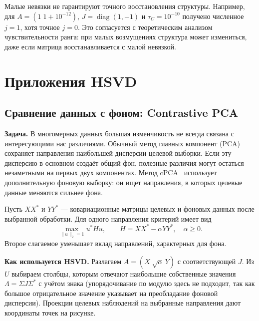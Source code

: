 \documentclass[a4paper,12pt]{article}
\DeclareMathOperator{\diag}{diag}
\theoremstyle{csstyle}
\begin{document}
Малые невязки не гарантируют точного восстановления структуры.
Например, для $A=(1\;1+10^{-12})$, $J=\diag(1,-1)$ и
$\tau_C=10^{-10}$ получено численное $j=1$, хотя точное $j=0$.
Это согласуется с теоретическим анализом чувствительности ранга:
при малых возмущениях структура может измениться, даже если матрица
восстанавливается с малой невязкой.



\section{Приложения HSVD}
\label{sec:applications}

\subsection{Сравнение данных с фоном: Contrastive PCA}
\textbf{Задача.}
В многомерных данных большая изменчивость не всегда связана
с интересующими нас различиями. Обычный метод главных компонент (PCA)
сохраняет направления наибольшей дисперсии целевой выборки.
Если эту дисперсию в основном создаёт общий фон, полезные различия
могут остаться незаметными на первых двух компонентах.
Метод cPCA~\cite{cPCA} использует дополнительную фоновую выборку:
он ищет направления, в которых целевые данные меняются сильнее фона.

Пусть $XX^*$ и $YY^*$ --- ковариационные матрицы целевых и фоновых
данных после выбранной обработки. Для одного направления критерий имеет вид
\[
\max_{\|u\|_2=1}u^*Hu,\qquad H=XX^*-\alpha YY^*,\quad\alpha\ge0.
\]
Второе слагаемое уменьшает вклад направлений, характерных для фона.

\textbf{Как используется HSVD.}
Разлагаем $A=(X\;\sqrt\alpha\,Y)$ с соответствующей $J$.
Из $U$ выбираем столбцы, которым отвечают наибольшие
собственные значения $\Lambda=\Sigma J\Sigma^*$ с учётом знака (упорядочивание по модулю здесь не подходит, так как большое отрицательное
значение указывает на преобладание фоновой дисперсии).
Проекции целевых наблюдений на выбранные направления дают
координаты точек на рисунке.
\end{document}
